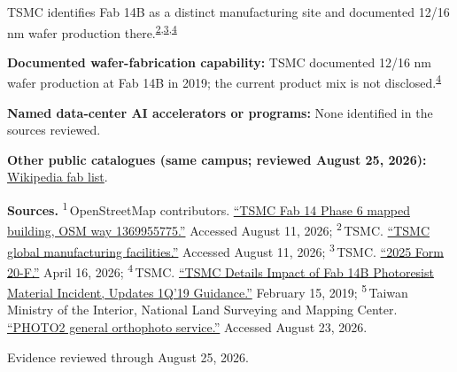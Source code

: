 \begin{minipage}[t][0.90\textheight][t]{\textwidth}
\begin{minipage}[t]{\textwidth}
\begin{minipage}[t]{0.32\textwidth}
\medskip
{\footnotesize TSMC identifies Fab 14B as a distinct manufacturing site and documented 12/16 nm wafer production there.\nobreak\textsuperscript{\href{\detokenize{https://www.tsmc.com/english/aboutTSMC/TSMC_Fabs}}{\textcolor{accent}{2}},\href{\detokenize{https://investor.tsmc.com/sites/ir/sec-filings/2025_20F}\%\detokenize{20Report.pdf}}{\textcolor{accent}{3}},\href{\detokenize{https://pr.tsmc.com/english/news/1984}}{\textcolor{accent}{4}}}\par}
\medskip
{\footnotesize\textbf{Documented wafer-fabrication capability:} TSMC documented 12/16 nm wafer production at Fab 14B in 2019; the current product mix is not disclosed.\nobreak\textsuperscript{\href{\detokenize{https://pr.tsmc.com/english/news/1984}}{\textcolor{accent}{4}}}\par}
\end{minipage}
\end{minipage}
\par\vspace{0.65em}
\medskip
{\footnotesize\textbf{Named data-center AI accelerators or programs:} None identified in the sources reviewed.\par}
\smallskip
{\sffamily\scriptsize\color{black!62}\textbf{Other public catalogues (same campus; reviewed August 25, 2026):} \href{\detokenize{https://en.wikipedia.org/w/index.php?title=List_of_semiconductor_fabrication_plants&oldid=1370451124}\#\detokenize{Open_plants}}{Wikipedia fab list}.\par}
\medskip
{\sffamily\scriptsize\setlength{\emergencystretch}{1.5em}\textbf{Sources.} \textsuperscript{1}\,OpenStreetMap contributors. \href{\detokenize{https://www.openstreetmap.org/way/1369955775}}{\enquote{TSMC Fab 14 Phase 6 mapped building, OSM way 1369955775.}} Accessed August 11, 2026; \textsuperscript{2}\,TSMC. \href{\detokenize{https://www.tsmc.com/english/aboutTSMC/TSMC_Fabs}}{\enquote{TSMC global manufacturing facilities.}} Accessed August 11, 2026; \textsuperscript{3}\,TSMC. \href{\detokenize{https://investor.tsmc.com/sites/ir/sec-filings/2025_20F}\%\detokenize{20Report.pdf}}{\enquote{2025 Form 20-F.}} April 16, 2026; \textsuperscript{4}\,TSMC. \href{\detokenize{https://pr.tsmc.com/english/news/1984}}{\enquote{TSMC Details Impact of Fab 14B Photoresist Material Incident, Updates 1Q'19 Guidance.}} February 15, 2019; \textsuperscript{5}\,Taiwan Ministry of the Interior, National Land Surveying and Mapping Center. \href{\detokenize{https://maps.nlsc.gov.tw/S09SOA/pro/Wms_ajax_list.jsp}}{\enquote{PHOTO2 general orthophoto service.}} Accessed August 23, 2026.\par}
\vfill
\noindent{\color{hairline}\rule{\linewidth}{0.4pt}}\par\smallskip
{\sffamily\scriptsize\color{black!58} Evidence reviewed through August 25, 2026.\par}
\end{minipage}
